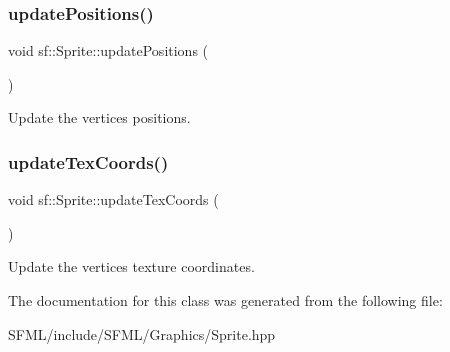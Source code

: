 \subsubsection{\texorpdfstring{updatePositions()}{updatePositions()}}
{\footnotesize\ttfamily void sf\+::\+Sprite\+::update\+Positions (\begin{DoxyParamCaption}{ }\end{DoxyParamCaption})\hspace{0.3cm}{\ttfamily [private]}}



Update the vertices\textquotesingle{} positions. 

\begin{DoxyVerb}\end{DoxyVerb}
 \mbox{\label{classsf_1_1_sprite_ae5e26f96031b2c0727fc27fd602feb5c}} 
\subsubsection{\texorpdfstring{updateTexCoords()}{updateTexCoords()}}
{\footnotesize\ttfamily void sf\+::\+Sprite\+::update\+Tex\+Coords (\begin{DoxyParamCaption}{ }\end{DoxyParamCaption})\hspace{0.3cm}{\ttfamily [private]}}



Update the vertices\textquotesingle{} texture coordinates. 

\begin{DoxyVerb}\end{DoxyVerb}
 

The documentation for this class was generated from the following file\+:\begin{DoxyCompactItemize}
\item 
S\+F\+M\+L/include/\+S\+F\+M\+L/\+Graphics/Sprite.\+hpp\end{DoxyCompactItemize}
